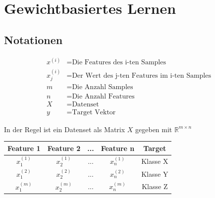 \newpage
\section{Gewichtbasiertes Lernen}
\subsection{Notationen}
\begin{flushleft}

\begin{align*}
x^{(i)} &= \text{Die Features des i-ten Samples} \\
x_{j}^{(i)} &= \text{Der Wert des j-ten Features im i-ten Samples} \\
m &= \text{Die Anzahl Samples} \\
n &= \text{Die Anzahl Features} \\
X &= \text{Datenset} \\
y &= \text{Target Vektor}
\end{align*}

In der Regel ist ein Datenset als Matrix $X$ gegeben mit $\mathbb{R}^{m \times n}$


\begin{center}
	\begin{table}[h]
	\begin{tabular}{|c|c|c|c|c|}
		\hline
		\textbf{Feature 1} & \textbf{Feature 2} & \textbf{...} & \textbf{Feature n} & \textbf{Target} \\ 
		\hline
		$x_{1}^{(1)}$ & $x_{2}^{(1)}$ & ... & $x_{n}^{(1)}$ & Klasse X  \\ 
		\hline
		$x_{1}^{(2)}$ & $x_{2}^{(2)}$ & ... & $x_{n}^{(2)}$ & Klasse Y  \\ 
		\hline
		$x_{1}^{(m)}$ & $x_{2}^{(m)}$  & ... & $x_{n}^{(m)}$  & Klasse Z  \\ 
		\hline
	\end{tabular}
\end{table}
\end{center}


\end{flushleft}



\newpage
